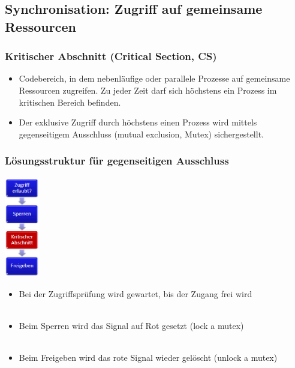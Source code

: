 \subsection{Synchronisation: Zugriff auf gemeinsame Ressourcen}
\subsubsection{Kritischer Abschnitt (Critical Section, CS)}
\begin{itemize}
  \item Codebereich, in dem nebenläufige oder parallele Prozesse auf gemeinsame Ressourcen zugreifen. Zu jeder Zeit darf sich höchstens ein Prozess im kritischen Bereich
  befinden.
  \item Der exklusive Zugriff durch höchstens einen Prozess wird mittels gegenseitigem Ausschluss (mutual exclusion, Mutex) sichergestellt.
\end{itemize}

\subsubsection{Lösungsstruktur für gegenseitigen Ausschluss}
\begin{minipage}[c]{2cm}
  \includegraphics[width=1.5cm]{images/Concurrency/Loesungsstruktur.png}
\end{minipage}
\begin{minipage}[c]{14cm}
  \begin{itemize}
    \item Bei der Zugriffsprüfung wird gewartet, bis der Zugang frei wird \\ \ \\
    \item Beim Sperren wird das Signal auf Rot gesetzt (lock a mutex) \\ \ \\
    \item Beim Freigeben wird das rote Signal wieder gelöscht (unlock a mutex)
  \end{itemize}
\end{minipage}

